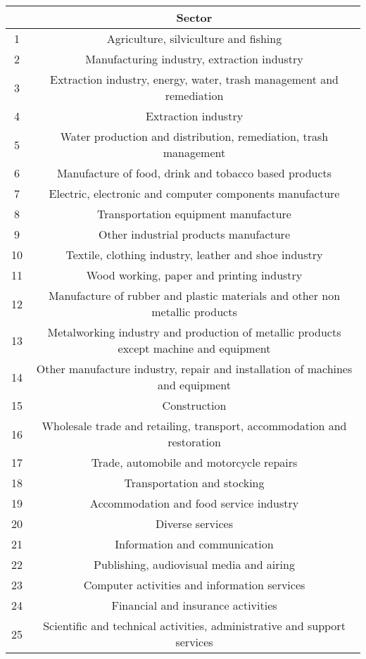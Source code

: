 \documentclass[]{article}
\begin{document}
\begin{table}[H]
\centering
\begin{tabular}{cc}
  \hline
 & Sector \\ 
  \hline
1 & Agriculture, silviculture and fishing \\ 
  2 & Manufacturing industry, extraction industry \\ 
  3 & Extraction industry, energy, water, trash management and remediation \\ 
  4 & Extraction industry \\ 
  5 & Water production and distribution, remediation, trash management \\ 
  6 & Manufacture of food, drink and tobacco based products \\ 
  7 & Electric, electronic and computer components manufacture \\ 
  8 & Transportation equipment manufacture \\ 
  9 & Other industrial products manufacture \\ 
  10 & Textile, clothing industry, leather and shoe industry \\ 
  11 & Wood working, paper and printing industry \\ 
  12 & Manufacture of rubber and plastic materials and other non metallic products \\ 
  13 & Metalworking industry and production of metallic products except machine and equipment \\ 
  14 & Other manufacture industry, repair and installation of machines and equipment \\ 
  15 & Construction \\ 
  16 & Wholesale trade and retailing, transport, accommodation and restoration \\ 
  17 & Trade, automobile and motorcycle repairs \\ 
  18 & Transportation and stocking \\ 
  19 & Accommodation and food service industry \\ 
  20 & Diverse services \\ 
  21 & Information and communication \\ 
  22 & Publishing, audiovisual media and airing \\ 
  23 & Computer activities and information services \\ 
  24 & Financial and insurance activities \\ 
  25 & Scientific and technical activities, administrative and support services \\ 

\end{tabular}
\end{table}
\end{document}
